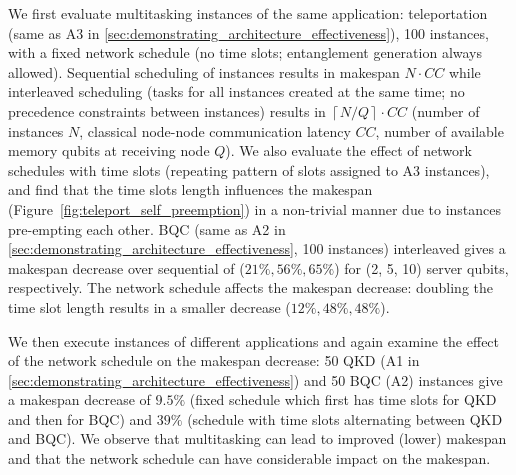We first evaluate multitasking instances of the same application: teleportation (same as A3 in \ref{sec:demonstrating_architecture_effectiveness}), 100 instances, with a fixed network schedule (no time slots; entanglement generation always allowed).
Sequential scheduling of instances results in makespan $N \cdot CC$
while interleaved scheduling (tasks for all instances created at the same time; no precedence constraints between instances) results in $\left\lceil N / Q \right\rceil \cdot CC$
(number of instances $N$, classical node-node communication latency $CC$, number of available memory qubits at receiving node $Q$).
We also evaluate the effect of network schedules with time slots (repeating pattern of slots assigned to A3 instances), and find that the time slots length influences the makespan (Figure~\ref{fig:teleport_self_preemption}) in a non-trivial manner due to instances pre-empting each other.
BQC (same as A2 in \ref{sec:demonstrating_architecture_effectiveness}, 100 instances) interleaved gives a makespan decrease over sequential of ($21\%, 56\%, 65\%$) for (2, 5, 10) server qubits, respectively.
The network schedule affects the makespan decrease: doubling the time slot length results in a smaller decrease ($12\%, 48\%, 48\%$). 

We then execute instances of different applications and again examine the effect of the network schedule on the makespan decrease: 50 QKD (A1 in \ref{sec:demonstrating_architecture_effectiveness}) and 50 BQC (A2) instances give a makespan decrease of $9.5\%$ (fixed schedule which first has time slots for QKD and then for BQC) and $39\%$ (schedule with time slots alternating between QKD and BQC).
We observe that multitasking can lead to improved (lower) makespan and that the network schedule can have considerable impact on the makespan.

